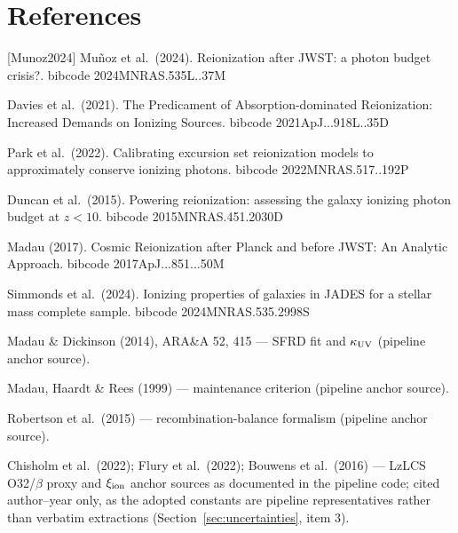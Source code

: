 \documentclass[twocolumn]{aastex702}
\begin{document}
\section*{References}
\footnotesize
[Munoz2024] Mu\~noz et al.\ (2024). Reionization after JWST: a photon budget crisis?. bibcode 2024MNRAS.535L..37M \par
[Davies2021] Davies et al.\ (2021). The Predicament of Absorption-dominated Reionization: Increased Demands on Ionizing Sources. bibcode 2021ApJ...918L..35D \par
[Park2022] Park et al.\ (2022). Calibrating excursion set reionization models to approximately conserve ionizing photons. bibcode 2022MNRAS.517..192P \par
[Duncan2015] Duncan et al.\ (2015). Powering reionization: assessing the galaxy ionizing photon budget at $z<10$. bibcode 2015MNRAS.451.2030D \par
[Madau2017] Madau (2017). Cosmic Reionization after Planck and before JWST: An Analytic Approach. bibcode 2017ApJ...851...50M \par
[Simmonds2024] Simmonds et al.\ (2024). Ionizing properties of galaxies in JADES for a stellar mass complete sample. bibcode 2024MNRAS.535.2998S \par
[MadauDickinson2014] Madau \& Dickinson (2014), ARA\&A 52, 415 --- SFRD fit and $\kappa_{\rm UV}$ (pipeline anchor source). \par
[MHR1999] Madau, Haardt \& Rees (1999) --- maintenance criterion (pipeline anchor source). \par
[Robertson2015] Robertson et al.\ (2015) --- recombination-balance formalism (pipeline anchor source). \par
Chisholm et al.\ (2022); Flury et al.\ (2022); Bouwens et al.\ (2016) --- LzLCS O32/$\beta$ proxy and $\xi_{\rm ion}$ anchor sources as documented in the pipeline code; cited author--year only, as the adopted constants are pipeline representatives rather than verbatim extractions (Section~\ref{sec:uncertainties}, item 3).
\end{document}

